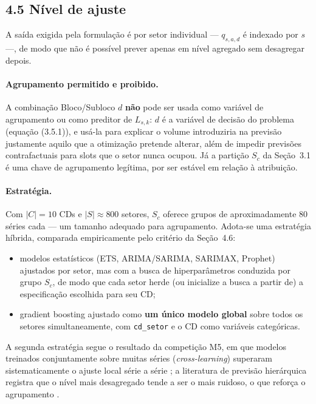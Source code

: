 \documentclass[11pt]{article}
\begin{document}
\subsection*{4.5 Nível de ajuste}

A saída exigida pela formulação é por setor individual --- $q_{s,a,d}$ é
indexado por $s$ ---, de modo que não é possível prever apenas em nível
agregado sem desagregar depois.

\paragraph{Agrupamento permitido e proibido.} A combinação Bloco/Subloco
$d$ \textbf{não} pode ser usada como variável de agrupamento ou como
preditor de $L_{s,k}$: $d$ é a variável de decisão do problema
(equação (3.5.1)), e usá-la para explicar o volume introduziria na
previsão justamente aquilo que a otimização pretende alterar, além de
impedir previsões contrafactuais para slots que o setor nunca ocupou. Já
a partição $S_c$ da Seção~3.1 é uma chave de agrupamento legítima, por
ser estável em relação à atribuição.

\paragraph{Estratégia.} Com $|C| = 10$ CDs e $|S| \approx 800$ setores,
$S_c$ oferece grupos de aproximadamente 80 séries cada --- um tamanho
adequado para agrupamento. Adota-se uma estratégia híbrida, comparada
empiricamente pelo critério da Seção~4.6:
\begin{itemize}
  \item modelos estatísticos (ETS, ARIMA/SARIMA, SARIMAX, Prophet)
    ajustados por setor, mas com a busca de hiperparâmetros conduzida por
    grupo $S_c$, de modo que cada setor herde (ou inicialize a busca a
    partir de) a especificação escolhida para seu CD;
  \item gradient boosting ajustado como \textbf{um único modelo global}
    sobre todos os setores simultaneamente, com \texttt{cd\_setor} e o CD
    como variáveis categóricas.
\end{itemize}

\noindent A segunda estratégia segue o resultado da competição M5, em que
modelos treinados conjuntamente sobre muitas séries (\emph{cross-learning})
superaram sistematicamente o ajuste local série a série
\cite{makridakis2022m5}; a literatura de previsão hierárquica registra que
o nível mais desagregado tende a ser o mais ruidoso, o que reforça o
agrupamento \cite{fpp3hierarchical}.
\end{document}
